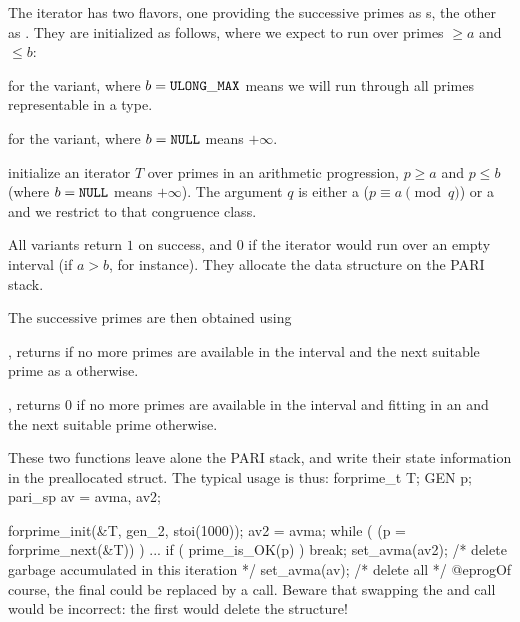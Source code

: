 The iterator has two flavors, one providing the successive primes as
s, the other as . They are initialized as follows,
where we expect to run over primes $\geq a$ and $\leq b$:

 for the
 variant, where $b = {\tt ULONG\_MAX}$ means we will run through
all primes representable in a  type.

 for the 
variant, where $b = {\tt NULL}$ means $+\infty$.

 initialize
an iterator $T$ over primes in an arithmetic progression, $p \geq a$ and $p
\leq b$ (where $b = {\tt NULL}$ means $+\infty$). The argument $q$ is
either a  ($p \equiv a \pmod{q}$) or a  
and we restrict to that congruence class.

All variants return $1$ on success, and $0$ if the iterator would run over an
empty interval (if $a > b$, for instance). They allocate the 
data structure on the PARI stack.

\noindent The successive primes are then obtained using

, returns  if no more primes
are available in the interval and the next suitable prime as a 
otherwise.

, returns $0$ if no more primes
are available in the interval and fitting in an  and the next
suitable prime otherwise.

These two functions leave alone the PARI stack, and write their state
information in the preallocated  struct. The typical usage is
thus:
\bprog
  forprime_t T;
  GEN p;
  pari_sp av = avma, av2;

  forprime_init(&T, gen_2, stoi(1000));
  av2 = avma;
  while ( (p = forprime_next(&T)) )
  {
    ...
    if ( prime_is_OK(p) ) break;
    set_avma(av2); /* delete garbage accumulated in this iteration */
  }
  set_avma(av); /* delete all */
@eprog\noindent Of course, the final  could be replaced
by a  call. Beware that swapping the
 and  call would be incorrect: the
first  would delete the  structure!


